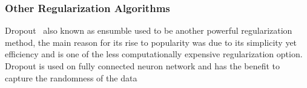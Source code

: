 \subsubsection{Other Regularization Algorithms}

Dropout~\cite{JMLR:v15:srivastava14a} also known as ensumble used to be another powerful regularization method, the main reason for its rise to popularity was due to its simplicity yet efficiency and is one of the less computationally expensive regularization option. Dropout is used on fully connected neuron network and has the benefit to capture the randomness of the data